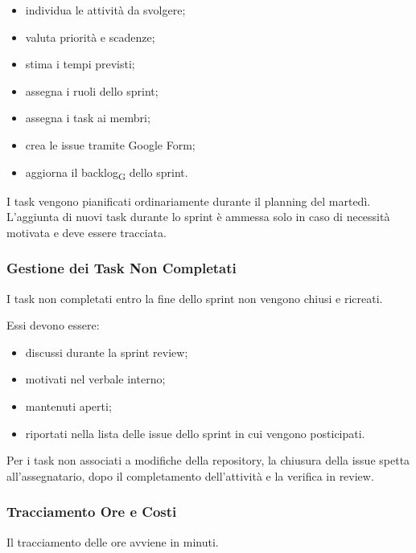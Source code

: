 \begin{itemize}
    \item individua le attività da svolgere;
    \item valuta priorità e scadenze;
    \item stima i tempi previsti;
    \item assegna i ruoli dello sprint;
    \item assegna i task ai membri;
    \item crea le issue tramite Google Form;
    \item aggiorna il backlog\textsubscript{G} dello sprint.
\end{itemize}

I task vengono pianificati ordinariamente durante il planning del martedì.
L'aggiunta di nuovi task durante lo sprint è ammessa solo in caso di necessità
motivata e deve essere tracciata.


\subsubsection{Gestione dei Task Non Completati}

I task non completati entro la fine dello sprint non vengono chiusi e ricreati.

Essi devono essere:

\begin{itemize}
    \item discussi durante la sprint review;
    \item motivati nel verbale interno;
    \item mantenuti aperti;
    \item riportati nella lista delle issue dello sprint in cui vengono posticipati.
\end{itemize}

Per i task non associati a modifiche della repository, la chiusura della issue
spetta all'assegnatario, dopo il completamento dell'attività e la verifica in
review.


\subsubsection{Tracciamento Ore e Costi}
\label{sec:calcolo-ore}

Il tracciamento delle ore avviene in minuti.


